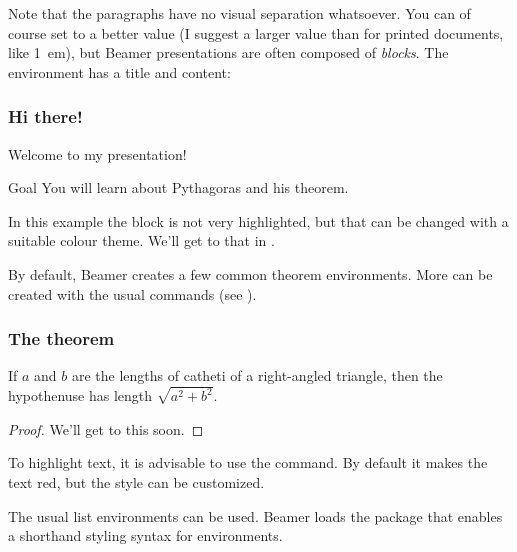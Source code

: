 Note that the paragraphs have no visual separation whatsoever.
You can of course set  to a better value
(I suggest a larger value than for printed documents, like 1~em),
but Beamer presentations are often composed of \emph{blocks}.
The  environment has a title and content:
%
\begin{ExampleCode}
\begin{frame}
\frametitle{Hi there!}

Welcome to my presentation!

\begin{block}{Goal}
You will learn about Pythagoras and his theorem.
\end{block}
\end{frame}
\end{ExampleCode}
%
%
In this example the block is not very highlighted,
but that can be changed with a suitable colour theme.
We'll get to that in .

By default, Beamer creates a few common theorem environments.
More can be created with the usual  commands (see ).
%
\begin{ExampleCode}
\begin{frame}
\frametitle{The theorem}

\begin{theorem}
If $a$ and $b$ are the lengths of catheti of a right-angled triangle,
then the hypothenuse has length $\sqrt{a^2 + b^2}$.
\end{theorem}
\begin{proof}
We'll get to this soon.
\end{proof}

\end{frame}
\end{ExampleCode}
%


To highlight text, it is advisable to use the  command.
By default it makes the text red, but the style can be customized.

The usual list environments can be used.
Beamer loads the  package that enables a shorthand styling syntax
for  environments.

